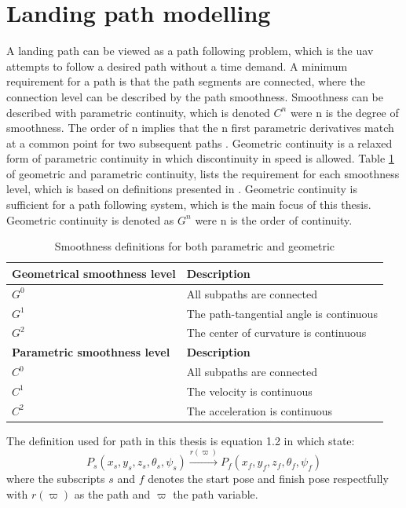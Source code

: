 \section{Landing path modelling}
A landing path can be viewed as a path following problem, which is the \gls{uav} attempts to follow a desired path without a time demand. A minimum requirement for a path is that the path segments are connected, where the connection level can be described by the path smoothness. Smoothness can be described with parametric continuity, which is denoted $C^n$ were n is the degree of smoothness. The order of n implies that the n first parametric derivatives match at a common point for two subsequent paths \citep{barsky1989geometric}. Geometric continuity is a relaxed form of parametric continuity in which discontinuity in speed is allowed. Table \ref{TB:SmoothnessDescriptions} of geometric and parametric continuity, lists the requirement for each smoothness level, which is based on definitions presented in \citep{barsky1989geometric}. Geometric continuity is sufficient for a path following system, which is the main focus of this thesis. Geometric continuity is denoted as $G^n$ were n is the order of continuity.
\begin{table}[H]
\begin{center}
\begin{tabular}{| l | l |}
\hline
\textbf{Geometrical smoothness level} & \textbf{Description} \\ \hline
$G^0$ & All subpaths are connected \\ \hline
$G^1$ & The path-tangential angle is continuous \\ \hline
$G^2$ & The center of curvature is continuous \\ \hline
\textbf{Parametric smoothness level} & \textbf{Description} \\ \hline
$C^0$ & All subpaths are connected \\ \hline
$C^1$ & The velocity is continuous \\ \hline
$C^2$ & The acceleration is continuous \\ \hline
\end{tabular}
\end{center}
\caption{Smoothness definitions for both parametric and geometric}
\label{TB:SmoothnessDescriptions}
\end{table} 
The definition used for path in this thesis is equation 1.2 in \citep{tsourdos2010cooperative} which state:
\begin{equation}
P_s(x_s,y_s,z_s,\theta_s,\psi_s) \xrightarrow{r(\varpi)} P_f(x_f,y_f,z_f,\theta_f,\psi_f)
\end{equation}
where the subscripts $s$ and $f$ denotes the start pose and finish pose respectfully with $r(\varpi)$ as the path and $\varpi$ the path variable.

